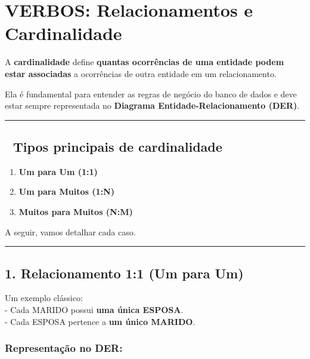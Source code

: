 \documentclass[
]{book}
\providecommand{\tightlist}{%
  \setlength{\itemsep}{0pt}\setlength{\parskip}{0pt}}
\begin{document}
\section{VERBOS: Relacionamentos e Cardinalidade}\label{verbos-relacionamentos-e-cardinalidade}

A \textbf{cardinalidade} define \textbf{quantas ocorrências de uma entidade podem estar associadas} a ocorrências de outra entidade em um relacionamento.

Ela é fundamental para entender as regras de negócio do banco de dados e deve estar sempre representada no \textbf{Diagrama Entidade-Relacionamento (DER)}.

\begin{center}\rule{0.5\linewidth}{0.5pt}\end{center}

\subsection{🔹 Tipos principais de cardinalidade}\label{tipos-principais-de-cardinalidade}

\begin{enumerate}
\def\labelenumi{\arabic{enumi}.}
\tightlist
\item
  \textbf{Um para Um (1:1)}\\
\item
  \textbf{Um para Muitos (1:N)}\\
\item
  \textbf{Muitos para Muitos (N:M)}
\end{enumerate}

A seguir, vamos detalhar cada caso.

\begin{center}\rule{0.5\linewidth}{0.5pt}\end{center}

\subsection{\texorpdfstring{1. Relacionamento \textbf{1:1 (Um para Um)}}{1. Relacionamento 1:1 (Um para Um)}}\label{relacionamento-11-um-para-um}

Um exemplo clássico:\\
- Cada MARIDO possui \textbf{uma única ESPOSA}.\\
- Cada ESPOSA pertence a \textbf{um único MARIDO}.

\subsubsection{Representação no DER:}\label{representauxe7uxe3o-no-der}
\end{document}
